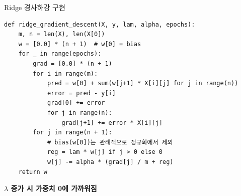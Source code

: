 \begin{frame}[fragile]{Ridge 경사하강 구현}
\begin{lstlisting}
def ridge_gradient_descent(X, y, lam, alpha, epochs):
    m, n = len(X), len(X[0])
    w = [0.0] * (n + 1)  # w[0] = bias
    for _ in range(epochs):
        grad = [0.0] * (n + 1)
        for i in range(m):
            pred = w[0] + sum(w[j+1] * X[i][j] for j in range(n))
            error = pred - y[i]
            grad[0] += error
            for j in range(n):
                grad[j+1] += error * X[i][j]
        for j in range(n + 1):
            # bias(w[0])는 관례적으로 정규화에서 제외
            reg = lam * w[j] if j > 0 else 0
            w[j] -= alpha * (grad[j] / m + reg)
    return w
\end{lstlisting}
  \textbf{$\lambda$ 증가 시 가중치 0에 가까워짐}

\end{frame}
